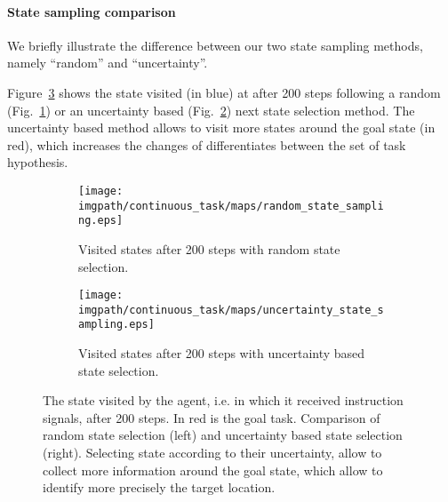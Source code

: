 \paragraph{State sampling comparison}

We briefly illustrate the difference between our two state sampling methods, namely ``random'' and ``uncertainty''.

Figure~\ref{fig:continuoustaskstatesampling} shows the state visited (in blue) at after 200 steps  following a random (Fig.~\ref{fig:continuousstaterandomstates}) or an uncertainty based (Fig.~\ref{fig:continuousstateuncertaintystates}) next state selection method. The uncertainty based method allows to visit more states around the goal state (in red), which increases the changes of differentiates between the set of task hypothesis.

\begin{figure}[!ht]
\centering
    \begin{subfigure}[t]{0.49\columnwidth}
        \centering
        \texttt{[image: \\imgpath/continuous\_task/maps/random\_state\_sampling.eps]}
        \caption{Visited states after 200 steps with random state selection.}
        \label{fig:continuousstaterandomstates}
    \end{subfigure}
    \begin{subfigure}[t]{0.49\columnwidth}
        \centering
        \texttt{[image: \\imgpath/continuous\_task/maps/uncertainty\_state\_sampling.eps]}
        \caption{Visited states after 200 steps with uncertainty based state selection.}
        \label{fig:continuousstateuncertaintystates}
    \end{subfigure}
\caption{The state visited by the agent, i.e. in which it received instruction signals, after 200 steps. In red is the goal task. Comparison of random state selection (left) and uncertainty based state selection (right). Selecting state according to their uncertainty, allow to collect more information around the goal state, which allow to identify more precisely the target location.}
\label{fig:continuoustaskstatesampling}
\end{figure}

